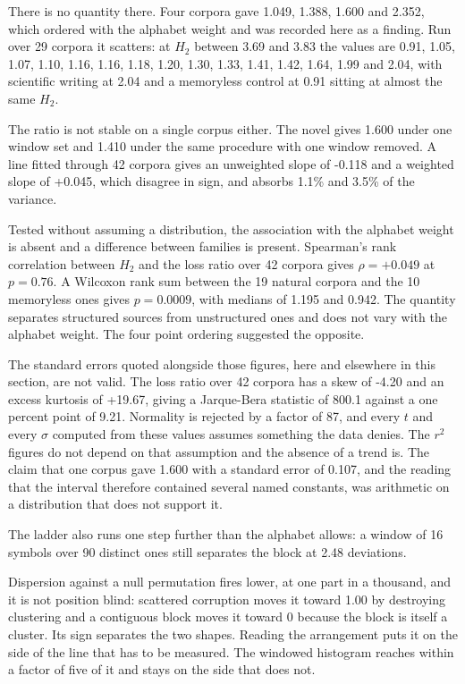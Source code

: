 There is no quantity there. Four corpora gave 1.049, 1.388, 1.600 and 2.352, which ordered with the alphabet weight and was recorded here as a finding. Run over 29 corpora it scatters: at \(H_2\) between 3.69 and 3.83 the values are 0.91, 1.05, 1.07, 1.10, 1.16, 1.16, 1.18, 1.20, 1.30, 1.33, 1.41, 1.42, 1.64, 1.99 and 2.04, with scientific writing at 2.04 and a memoryless control at 0.91 sitting at almost the same \(H_2\).

The ratio is not stable on a single corpus either. The novel gives 1.600 under one window set and 1.410 under the same procedure with one window removed. A line fitted through 42 corpora gives an unweighted slope of -0.118 and a weighted slope of +0.045, which disagree in sign, and absorbs 1.1\% and 3.5\% of the variance.

Tested without assuming a distribution, the association with the alphabet weight is absent and a difference between families is present. Spearman's rank correlation between \(H_2\) and the loss ratio over 42 corpora gives \(\rho = +0.049\) at \(p = 0.76\). A Wilcoxon rank sum between the 19 natural corpora and the 10 memoryless ones gives \(p = 0.0009\), with medians of 1.195 and 0.942. The quantity separates structured sources from unstructured ones and does not vary with the alphabet weight. The four point ordering suggested the opposite.

The standard errors quoted alongside those figures, here and elsewhere in this section, are not valid. The loss ratio over 42 corpora has a skew of -4.20 and an excess kurtosis of +19.67, giving a Jarque-Bera statistic of 800.1 against a one percent point of 9.21. Normality is rejected by a factor of 87, and every \(t\) and every \(\sigma\) computed from these values assumes something the data denies. The \(r^2\) figures do not depend on that assumption and the absence of a trend is. The claim that one corpus gave 1.600 with a standard error of 0.107, and the reading that the interval therefore contained several named constants, was arithmetic on a distribution that does not support it.

The ladder also runs one step further than the alphabet allows: a window of 16 symbols over 90 distinct ones still separates the block at 2.48 deviations.

Dispersion against a null permutation fires lower, at one part in a thousand, and it is not position blind: scattered corruption moves it toward 1.00 by destroying clustering and a contiguous block moves it toward 0 because the block is itself a cluster. Its sign separates the two shapes. Reading the arrangement puts it on the side of the line that has to be measured. The windowed histogram reaches within a factor of five of it and stays on the side that does not.

